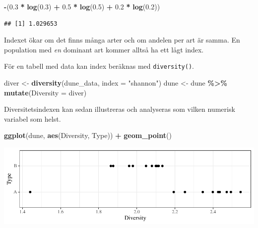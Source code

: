 \documentclass[
]{book}
\newenvironment{Shaded}{\begin{snugshade}}{\end{snugshade}}
\newcommand{\AttributeTok}[1]{\textcolor[rgb]{0.13,0.29,0.53}{#1}}
\newcommand{\FloatTok}[1]{\textcolor[rgb]{0.00,0.00,0.81}{#1}}
\newcommand{\FunctionTok}[1]{\textcolor[rgb]{0.13,0.29,0.53}{\textbf{#1}}}
\newcommand{\NormalTok}[1]{#1}
\newcommand{\OtherTok}[1]{\textcolor[rgb]{0.56,0.35,0.01}{#1}}
\newcommand{\SpecialCharTok}[1]{\textcolor[rgb]{0.81,0.36,0.00}{\textbf{#1}}}
\newcommand{\StringTok}[1]{\textcolor[rgb]{0.31,0.60,0.02}{#1}}
\theoremstyle{definition}
\theoremstyle{definition}
\theoremstyle{definition}
\theoremstyle{definition}
\theoremstyle{remark}
\begin{document}
\begin{Shaded}
\begin{Highlighting}[]
\SpecialCharTok{{-}}\NormalTok{(}\FloatTok{0.3} \SpecialCharTok{*} \FunctionTok{log}\NormalTok{(}\FloatTok{0.3}\NormalTok{) }\SpecialCharTok{+} \FloatTok{0.5} \SpecialCharTok{*} \FunctionTok{log}\NormalTok{(}\FloatTok{0.5}\NormalTok{) }\SpecialCharTok{+} \FloatTok{0.2} \SpecialCharTok{*} \FunctionTok{log}\NormalTok{(}\FloatTok{0.2}\NormalTok{))}
\end{Highlighting}
\end{Shaded}

\begin{verbatim}
## [1] 1.029653
\end{verbatim}

Indexet ökar om det finns många arter och om andelen per art är samma. En population med \emph{en} dominant art kommer alltså ha ett lågt index.

För en tabell med data kan index beräknas med \texttt{diversity()}.

\begin{Shaded}
\begin{Highlighting}[]
\NormalTok{diver }\OtherTok{\textless{}{-}} \FunctionTok{diversity}\NormalTok{(dune\_data, }\AttributeTok{index =} \StringTok{"shannon"}\NormalTok{)}
\NormalTok{dune }\OtherTok{\textless{}{-}}\NormalTok{ dune }\SpecialCharTok{\%\textgreater{}\%} \FunctionTok{mutate}\NormalTok{(}\AttributeTok{Diversity =}\NormalTok{ diver)}
\end{Highlighting}
\end{Shaded}

Diversitetsindexen kan sedan illustreras och analyseras som vilken numerisk variabel som helst.

\begin{Shaded}
\begin{Highlighting}[]
\FunctionTok{ggplot}\NormalTok{(dune, }\FunctionTok{aes}\NormalTok{(Diversity, Type)) }\SpecialCharTok{+} \FunctionTok{geom\_point}\NormalTok{()}
\end{Highlighting}
\end{Shaded}

\begin{center}\includegraphics{R-anvisningar_files/figure-latex/unnamed-chunk-258-1} \end{center}
\end{document}
